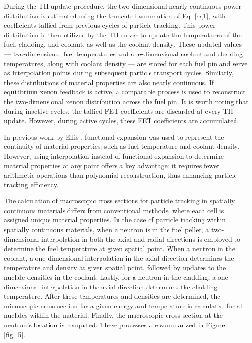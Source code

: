 During the TH update procedure, the two-dimensional nearly continuous power distribution is estimated using the truncated summation of Eq. \ref{eq1}, with coefficients tallied from previous cycles of particle tracking. This power distribution is then utilized by the TH solver to update the temperatures of the fuel, cladding, and coolant, as well as the coolant density. These updated values — two-dimensional fuel temperatures and one-dimensional coolant and cladding temperatures, along with coolant density — are stored for each fuel pin and serve as interpolation points during subsequent particle transport cycles. Similarly, these distributions of material properties are also nearly continuous. If equilibrium xenon feedback is active, a comparable process is used to reconstruct the two-dimensional xenon distribution across the fuel pin. It is worth noting that during inactive cycles, the tallied FET coefficients are discarded at every TH update. However, during active cycles, these FET coefficients are accumulated.

In previous work by Ellis \cite{ellis, ellis_2016}, functional expansion was used to represent the continuity of material properties, such as fuel temperature and coolant density. However, using interpolation instead of functional expansion to determine material properties at any point offers a key advantage: it requires fewer arithmetic operations than polynomial reconstruction, thus enhancing particle tracking efficiency.

The calculation of macroscopic cross sections for particle tracking in spatially continuous materials differs from conventional methods, where each cell is assigned unique material properties. In the case of particle tracking within spatially continuous materials, when a neutron is in the fuel pellet, a two-dimensional interpolation in both the axial and radial directions is employed to determine the fuel temperature at given spatial point. When a neutron in the coolant, a one-dimensional interpolation in the axial direction determines the temperature and density at given spatial point, followed by updates to the nuclide densities in the coolant. Lastly, for a neutron in the cladding, a one-dimensional interpolation in the axial direction determines the cladding temperature. After these temperatures and densities are determined, the microscopic cross section for a given energy and temperature is calculated for all nuclides within the material. Finally, the macroscopic cross section at the neutron's location is computed. These processes are summarized in Figure \ref{fig_5}.

